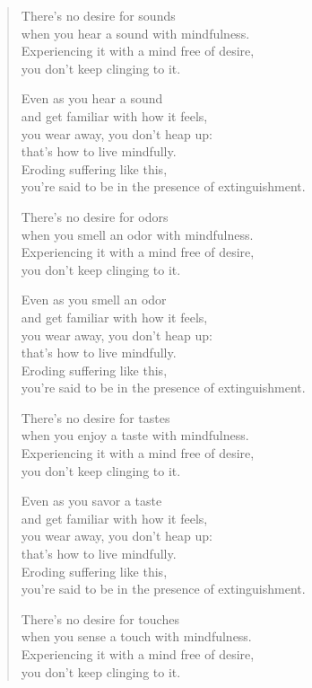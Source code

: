 \documentclass[12pt,openany]{book}%
\begin{document}
\begin{verse}
There’s no desire for sounds \\
when you hear a sound with mindfulness. \\
Experiencing it with a mind free of desire, \\
you don’t keep clinging to it. 

Even as you hear a sound \\
and get familiar with how it feels, \\
you wear away, you don’t heap up: \\
that’s how to live mindfully. \\
Eroding suffering like this, \\
you’re said to be in the presence of extinguishment. 

There’s no desire for odors \\
when you smell an odor with mindfulness. \\
Experiencing it with a mind free of desire, \\
you don’t keep clinging to it. 

Even as you smell an odor \\
and get familiar with how it feels, \\
you wear away, you don’t heap up: \\
that’s how to live mindfully. \\
Eroding suffering like this, \\
you’re said to be in the presence of extinguishment. 

There’s no desire for tastes \\
when you enjoy a taste with mindfulness. \\
Experiencing it with a mind free of desire, \\
you don’t keep clinging to it. 

Even as you savor a taste \\
and get familiar with how it feels, \\
you wear away, you don’t heap up: \\
that’s how to live mindfully. \\
Eroding suffering like this, \\
you’re said to be in the presence of extinguishment. 

There’s no desire for touches \\
when you sense a touch with mindfulness. \\
Experiencing it with a mind free of desire, \\
you don’t keep clinging to it. 


\end{verse}
\end{document}
